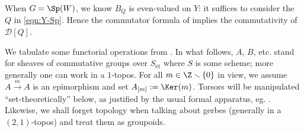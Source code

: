 \documentclass[a4paper,10pt]{article}
\begin{document}
\begin{example}
	When $G = \Sp(W)$, we know $B_Q$ is even-valued on $Y$: it suffices to consider the $Q$ in \eqref{eqn:Y-Sp}. Hence the commutator formula of \cite[Proposition 3.11]{BD01} implies the commutativity of $\mathcal{D}[Q]$. 
\end{example}

We tabulate some functorial operations from \cite[\S 19.3]{Weis17}. In what follows, $A$, $B$, etc. stand for sheaves of commutative groups over $S_{\text{ét}}$ where $S$ is some scheme; more generally one can work in a $1$-topos. For all $m \in \Z \smallsetminus \{0\}$ in view, we assume $A \xrightarrow{m} A$ is an epimorphism and set $A_{[m]} := \Ker(m)$. Torsors will be manipulated ``set-theoretically'' below, as justified by the usual formal apparatus, eg. \cite[Exp VII, I.1.2.1]{SGA7-1}. Likewise, we shall forget topology when talking about gerbes (generally in a $(2,1)$-topos) and treat them as groupoids.
\end{document}
